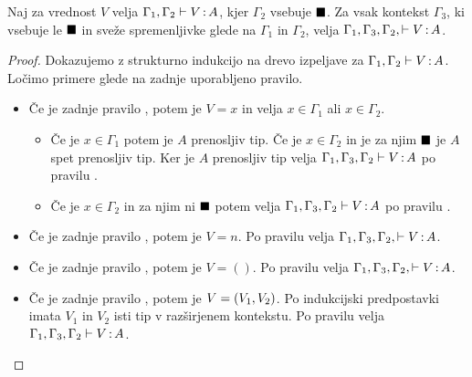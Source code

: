 \begin{lema}\label{lem:weakening-values-bb}
	Naj za vrednost $V$ velja $\Gamma_1, \Gamma_2 \vdash V \mathinner{:} A$, kjer $\Gamma_2$ vsebuje $\blacksquare$.
	Za vsak kontekst $\Gamma_3$, ki vsebuje le $\blacksquare$ in sveže spremenljivke glede na $\Gamma_1$ in $\Gamma_2$, velja $\Gamma_1, \Gamma_3, \Gamma_2, \vdash V \mathinner{:} A$.
\end{lema}

\begin{proof}
	Dokazujemo z strukturno indukcijo na drevo izpeljave za $\Gamma_1, \Gamma_2 \vdash V \mathinner{:} A$.
	Ločimo primere glede na zadnje uporabljeno pravilo.
	
	\begin{itemize}
		\item[\sitem] Če je zadnje pravilo , potem je $V = x$ in velja $x \in \Gamma_1$ ali $x \in \Gamma_2$.
		\begin{itemize}
			\item Če je $x \in \Gamma_1$ potem je $A$ prenosljiv tip. Če je $x \in \Gamma_2$ in je za njim $\blacksquare$ je $A$ spet prenosljiv tip.
			Ker je $A$ prenosljiv tip velja $\Gamma_1, \Gamma_3, \Gamma_2 \vdash V \mathinner{:} A$ po pravilu .
			\item Če je $x \in \Gamma_2$ in za njim ni $\blacksquare$ potem velja $\Gamma_1, \Gamma_3, \Gamma_2 \vdash V \mathinner{:} A$ po pravilu .
		\end{itemize}
		
		\item Če je zadnje pravilo , potem je $V = n$. Po pravilu  velja $\Gamma_1, \Gamma_3, \Gamma_2, \vdash V \mathinner{:} A$.
		
		\item Če je zadnje pravilo , potem je $V = ()$. Po pravilu  velja $\Gamma_1, \Gamma_3, \Gamma_2, \vdash V \mathinner{:} A$.
		
		\item Če je zadnje pravilo , potem je $V =( V_1 , V_2 )$.
		Po indukcijski predpostavki imata $V_1$ in $V_2$ isti tip v razširjenem kontekstu.
		Po pravilu  velja $\Gamma_1, \Gamma_3, \Gamma_2 \vdash V \mathinner{:} A$.
		

\end{itemize}
\end{proof}
